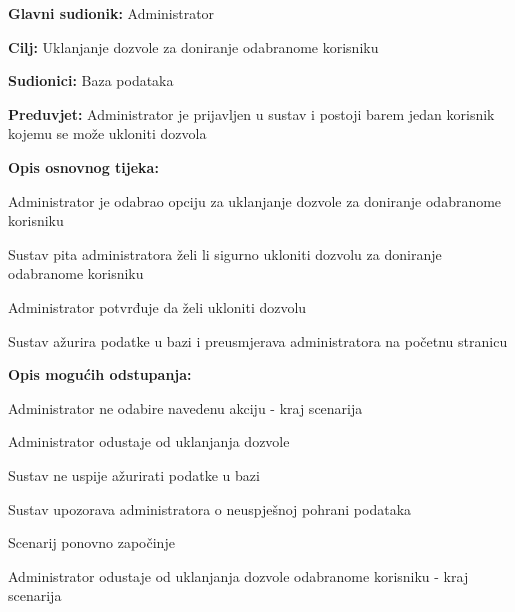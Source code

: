 					\noindent {}
					\begin{packed_item}
	
						\item \textbf{Glavni sudionik: }Administrator
						\item  \textbf{Cilj:} Uklanjanje dozvole za doniranje odabranome korisniku
						\item  \textbf{Sudionici:} Baza podataka
						\item  \textbf{Preduvjet:} Administrator je prijavljen u sustav i postoji barem jedan korisnik kojemu se može ukloniti dozvola
						
						\item  \textbf{Opis osnovnog tijeka:}
						
						\item[] \begin{packed_enum}
							\item Administrator je odabrao opciju za uklanjanje dozvole za doniranje odabranome korisniku
							\item Sustav pita administratora želi li sigurno ukloniti dozvolu za doniranje odabranome korisniku
							\item Administrator potvrđuje da želi ukloniti dozvolu
							\item Sustav ažurira podatke u bazi i preusmjerava administratora na početnu stranicu
						\end{packed_enum}

						\item  \textbf{Opis mogućih odstupanja:}

						\item[] \begin{packed_item}
							\item[1.a] Administrator ne odabire navedenu akciju - kraj scenarija
							\item[3.a] Administrator odustaje od uklanjanja dozvole
							\item[4.a] Sustav ne uspije ažurirati podatke u bazi
							\item[] \begin{packed_enum}
								\item Sustav upozorava administratora o neuspješnoj pohrani podataka
								\item
									\begin{packed_enum}
										\item Scenarij ponovno započinje 
										\item Administrator odustaje od uklanjanja dozvole odabranome korisniku - kraj scenarija
									\end{packed_enum}
							\end{packed_enum}					
						\end{packed_item}
					\end{packed_item}

